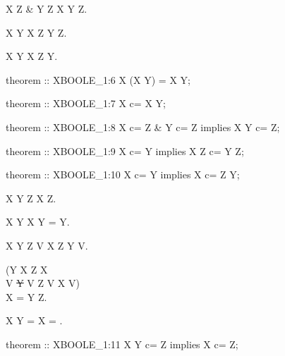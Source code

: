 \begin{paracol}{2}
\begin{theorem}
  X \subset Z \& Y \subset Z \implies X \cup Y \subset Z.
\end{theorem}

\begin{theorem}
  X \subset Y \implies X \cup Z \subset Y \cup Z.
\end{theorem}

\begin{theorem}
  X \subset Y \implies X \subset Z \cup Y.
\end{theorem}

\switchcolumn

\begin{mizar}
theorem :: XBOOLE_1:6
  X \/ (X \/ Y) = X \/ Y;

theorem :: XBOOLE_1:7
  X c= X \/ Y;

theorem :: XBOOLE_1:8
  X c= Z & Y c= Z implies X \/ Y c= Z;

theorem :: XBOOLE_1:9
  X c= Y implies X \/ Z c= Y \/ Z;

theorem :: XBOOLE_1:10
  X c= Y implies X c= Z \/ Y;
\end{mizar}

\switchcolumn*\ensurevspace{5cm}

\begin{theorem}
  X \cup Y \subset Z \implies X \subset Z.
\end{theorem}

\begin{theorem}
  X \subset Y \implies X \cup Y = Y.
\end{theorem}

\begin{theorem}
  X \subset Y \land Z \subset V \implies X \cup Z \subset Y \cup V.
\end{theorem}

\begin{theorem+}
  (Y \subset X \land Z \subset X \land\\
  \forall V \st Y \subset V \land Z \subset V
  \holds X \subset V) \\
  \implies X = Y \cup Z.
\end{theorem+}

\begin{theorem}
  X \cup Y = \emptyset \implies X = \emptyset.
\end{theorem}

\switchcolumn

\begin{mizar}
theorem :: XBOOLE_1:11
  X \/ Y c= Z implies X c= Z;


\end{mizar}
\end{paracol}
